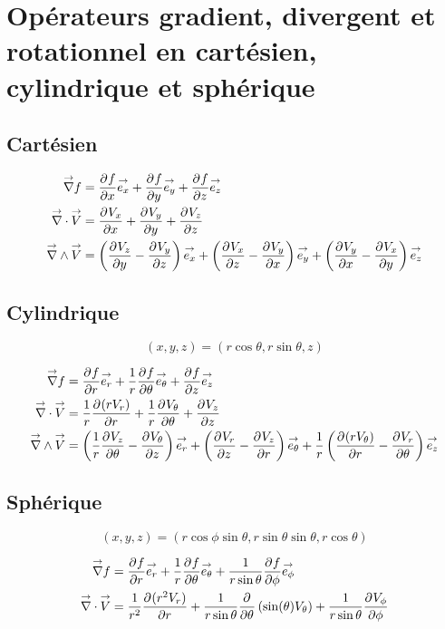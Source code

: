 \section{Opérateurs gradient, divergent et rotationnel en cartésien, cylindrique et sphérique}

\subsection{Cartésien}

    \begin{align}
        \vgrad f &= \ddr{x}{f}\vect{e_x} + \ddr{y}{f}\vect{e_y}  + \ddr{z}{f}\vect{e_z} \\
        \vdiv \vect{V} &= \ddr{x}{V_x} + \ddr{y}{V_y} + \ddr{z}{V_z} \\
        \vrot\vect{V} &= \left(\ddr{y}{V_z}-\ddr{z}{V_y}\right)\vect{e_x} + \left(\ddr{z}{V_x}-\ddr{x}{V_y}\right)\vect{e_y} + \left(\ddr{x}{V_y}-\ddr{y}{V_x}\right)\vect{e_z}
    \end{align}

\subsection{Cylindrique}

    \[
        (x,y,z) = (r\cos\theta,r\sin\theta,z)
    \]

    \begin{align}
        \vgrad f &= \ddr{r}{f}\vect{e_r}
        +\frac{1}{r}\ddr{\theta}{f}\vect{e_\theta} + \ddr{z}{f}\vect{e_z}
        \\
        \vdiv \vect{V} &= \frac{1}{r}\ddr{r}{(rV_r)}+\frac{1}{r}\ddr{\theta}{V_\theta}+\ddr{z}{V_z}
        \\
        \vrot \vect{V} &= \left(\frac{1}{r}\ddr{\theta}{V_z} - \ddr{z}{V_\theta}\right)\vect{e_r} +
        \left(\ddr{z}{V_r} - \ddr{r}{V_z}\right)\vect{e_\theta} +
        \frac{1}{r}\left(\ddr{r}{(rV_\theta)}-\ddr{\theta}{V_r}\right)\vect{e_z}
    \end{align}

\subsection{Sphérique}

    \[
        (x,y,z) = (r\cos\phi\sin\theta,r\sin\theta\sin\theta,r\cos\theta)
    \]

    \begin{align}
        \vgrad f &= \ddr{r}{f}\vect{e_r}
        +\frac{1}{r}\ddr{\theta}{f}\vect{e_\theta} + \frac{1}{r\sin\theta}\ddr{\phi}{f}\vect{e_\phi}
        \\
        \vdiv \vect{V} &= \frac{1}{r^2}\ddr{r}{(r^2V_r)}
        + \frac{1}{r\sin\theta}\ddr{\theta}{}\left(\sin(\theta)V_\theta\right) + \frac{1}{r\sin\theta}\ddr{\phi}{V_\phi}
    \end{align}

